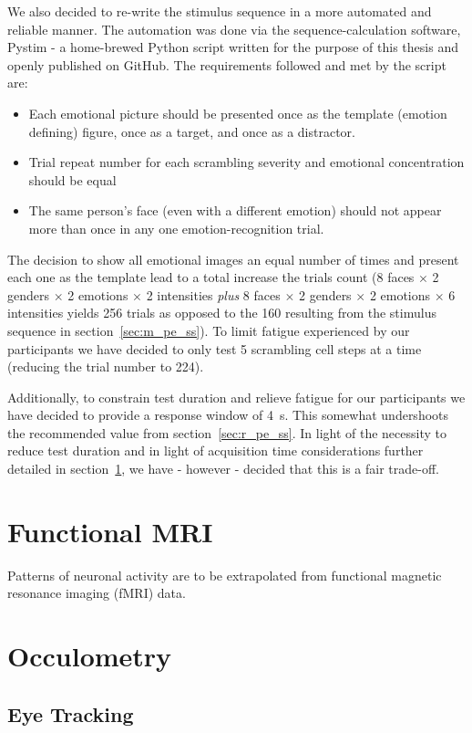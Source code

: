 	    We also decided to re-write the stimulus sequence in a more automated and reliable manner.
	    The automation was done via the sequence-calculation software, Pystim\cite{pystim} - a home-brewed Python script written for the purpose of this thesis and openly published on GitHub.
	    The requirements followed and met by the script are:
	    \begin{itemize}
		\item Each emotional picture should be presented once as the template (emotion defining) figure, once as a target, and once as a distractor.
		\item Trial repeat number for each scrambling severity and emotional concentration should be equal
		\item The same person's face (even with a different emotion) should not appear more than once in any one emotion-recognition trial.
	    \end{itemize}
	    The decision to show all emotional images an equal number of times and present each one as the template lead to a total increase the trials count
	    (8 faces $\times$ 2 genders $\times$ 2 emotions $\times$ 2 intensities \textit{plus} 8 faces $\times$ 2 genders $\times$ 2 emotions $\times$ 6 intensities yields 256 trials as opposed to the 160 resulting from the stimulus sequence in section~\ref{sec:m_pe_ss}).
	    To limit fatigue experienced by our participants we have decided to only test 5 scrambling cell steps at a time (reducing the trial number to 224).
	    
	    Additionally, to constrain test duration and relieve fatigue for our participants we have decided to provide a response window of \SI{4}{\second}.
	    This somewhat undershoots the recommended value from section~\ref{sec:r_pe_ss}.
	    In light of the necessity to reduce test duration and in light of acquisition time considerations further detailed in section~\ref{sec:m_fmri}, we have - however - decided that this is a fair trade-off.
    \section{Functional MRI}\label{sec:m_fmri}
	Patterns of neuronal activity are to be extrapolated from functional magnetic resonance imaging (fMRI) data.
    \section{Occulometry}\label{sec:m_om}
	\subsection{Eye Tracking}\label{sec:m_om_et}
